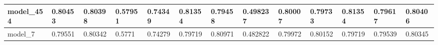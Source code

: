 \begin{tabular}{|l|l|l|l|l|l|l|l|l|l|l|l|l|}
model\_454     & 0.80453     & 0.80398        & 0.57951      & 0.74349          & 0.81354              & 0.79458              & 0.498237     & 0.80007           & 0.79733            & 0.81354         & 0.79617     & 0.80406      \\ \hline
model\_7       & 0.79551     & 0.80342        & 0.5771       & 0.74279          & 0.79719              & 0.80971              & 0.482822     & 0.79972           & 0.80152            & 0.79719         & 0.79539     & 0.80345      \\ \hline
\end{tabular}
